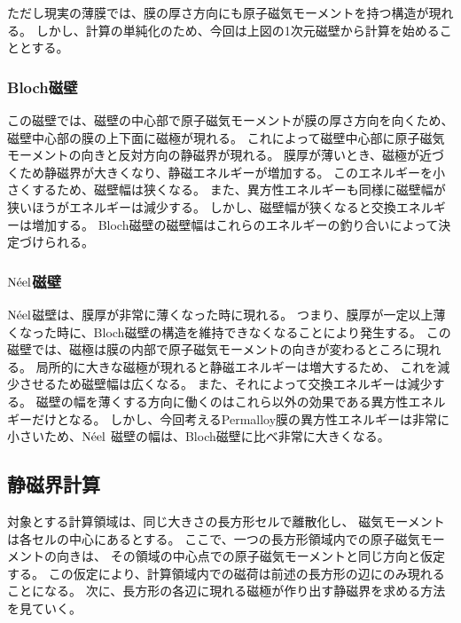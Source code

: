 \documentclass{jsarticle}
\begin{document}
ただし現実の薄膜では、膜の厚さ方向にも原子磁気モーメントを持つ構造が現れる。
しかし、計算の単純化のため、今回は上図の1次元磁壁から計算を始めることとする。

\subsubsection{Bloch磁壁}
この磁壁では、磁壁の中心部で原子磁気モーメントが膜の厚さ方向を向くため、
磁壁中心部の膜の上下面に磁極が現れる。
これによって磁壁中心部に原子磁気モーメントの向きと反対方向の静磁界が現れる。
膜厚が薄いとき、磁極が近づくため静磁界が大きくなり、静磁エネルギーが増加する。
このエネルギーを小さくするため、磁壁幅は狭くなる。
また、異方性エネルギーも同様に磁壁幅が狭いほうがエネルギーは減少する。
しかし、磁壁幅が狭くなると交換エネルギーは増加する。
Bloch磁壁の磁壁幅はこれらのエネルギーの釣り合いによって決定づけられる。

\subsubsection{$\mathrm{N\Acute{e}el}$磁壁}
$\mathrm{N\Acute{e}el}$磁壁は、膜厚が非常に薄くなった時に現れる。
つまり、膜厚が一定以上薄くなった時に、Bloch磁壁の構造を維持できなくなることにより発生する。
この磁壁では、磁極は膜の内部で原子磁気モーメントの向きが変わるところに現れる。
局所的に大きな磁極が現れると静磁エネルギーは増大するため、
これを減少させるため磁壁幅は広くなる。
また、それによって交換エネルギーは減少する。
磁壁の幅を薄くする方向に働くのはこれら以外の効果である異方性エネルギーだけとなる。
しかし、今回考えるPermalloy膜の異方性エネルギーは非常に小さいため、$\mathrm{N\Acute{e}el}$
磁壁の幅は、Bloch磁壁に比べ非常に大きくなる。

\subsection{静磁界計算}
対象とする計算領域は、同じ大きさの長方形セルで離散化し、
磁気モーメントは各セルの中心にあるとする。
ここで、一つの長方形領域内での原子磁気モーメントの向きは、
その領域の中心点での原子磁気モーメントと同じ方向と仮定する。
この仮定により、計算領域内での磁荷は前述の長方形の辺にのみ現れることになる。
次に、長方形の各辺に現れる磁極が作り出す静磁界を求める方法を見ていく。
\end{document}
